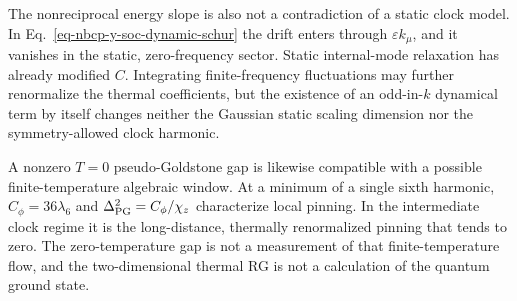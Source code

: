 The nonreciprocal energy slope is also not a contradiction of a static
clock model. In Eq.~\ref{eq-nbcp-y-soc-dynamic-schur} the drift enters
through \(\varepsilon k_\mu\), and it vanishes in the static,
zero-frequency sector. Static internal-mode relaxation has already
modified \(C\). Integrating finite-frequency fluctuations may further
renormalize the thermal coefficients, but the existence of an
odd-in-\(k\) dynamical term by itself changes neither the Gaussian
static scaling dimension nor the symmetry-allowed clock harmonic.

A nonzero \(T=0\) pseudo-Goldstone gap is likewise compatible with a
possible finite-temperature algebraic window. At a minimum of a single
sixth harmonic, \(C_\phi=36\lambda_6\) and
\(\Delta_{\rm PG}^2=C_\phi/\chi_z\) characterize local pinning. In the
intermediate clock regime it is the long-distance, thermally
renormalized pinning that tends to zero. The zero-temperature gap is not
a measurement of that finite-temperature flow, and the two-dimensional
thermal RG is not a calculation of the quantum ground state.

